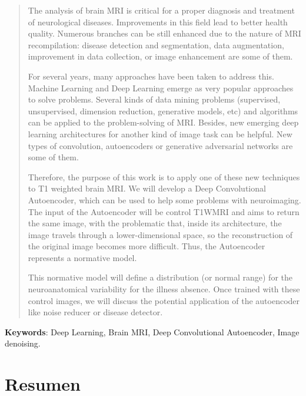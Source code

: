 \begin{quote}
{The analysis of brain MRI is critical for a proper diagnosis and treatment of neurological diseases. Improvements in this field lead to better health quality. Numerous branches can be still enhanced due to the nature of MRI recompilation: disease detection and segmentation, data augmentation, improvement in data collection, or image enhancement are some of them.

For several years, many approaches have been taken to address this. Machine Learning and Deep Learning emerge as very popular approaches to solve problems. Several kinds of data mining problems (supervised, unsupervised, dimension reduction, generative models, etc) and algorithms can be applied to the problem-solving of MRI. Besides, new emerging deep learning architectures for another kind of image task can be helpful. New types of convolution, autoencoders or generative adversarial networks are some of them.

Therefore, the purpose of this work is to apply one of these new techniques to T1 weighted brain MRI. We will develop a Deep Convolutional Autoencoder, which can be used to help some problems with neuroimaging. The input of the Autoencoder will be control T1WMRI and aims to return the same image, with the problematic that, inside its architecture, the image travels through a lower-dimensional space, so the reconstruction of the original image becomes more difficult. Thus, the Autoencoder represents a normative model.

This normative model will define a distribution (or normal range) for the neuroanatomical variability for the illness absence. Once trained with these control images, we will discuss the potential application of the autoencoder like noise reducer or disease detector.}
\end{quote}


\textbf{Keywords}: Deep Learning, Brain MRI, Deep Convolutional Autoencoder, Image denoising.

\clearpage

\chapter*{\centering Resumen}


